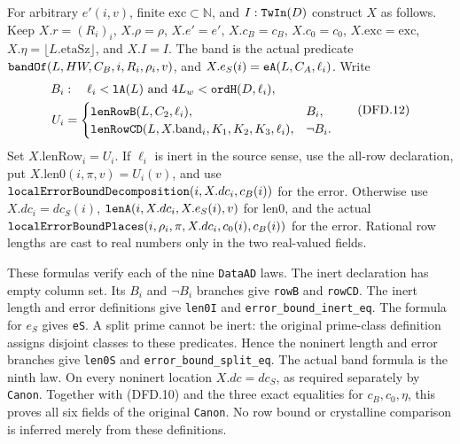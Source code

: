 For arbitrary $e'(i,v)$, finite $\mathrm{exc}\subset\mathbb N$,
and $I:\texttt{Tw\allowbreak In}(D)$ construct $X$ as follows. Keep
$X.r=(R_i)_i$, $X.\rho=\rho$, $X.e'=e'$, $X.c_B=c_B$,
$X.c_0=c_0$, $X.\mathrm{exc}=\mathrm{exc}$,
$X.\eta=\lfloor L.\mathrm{etaSz}\rfloor$, and $X.I=I$.
The band is the actual predicate
$\texttt{band\allowbreak Of}(L,HW,C_B,i,R_i,\rho_i,v)$, and
$X.e_S(i)=\texttt{e\allowbreak A}(L,C_A,\ell_i)$. Write
\[
 \begin{split}
 B_i&:\quad\ell_i<\texttt{l\allowbreak A}(L)
                    \ \text{and}\ 4L_w<\texttt{ord\allowbreak H}(D,\ell_i),\\
 U_i&=\begin{cases}
 \texttt{len\allowbreak Row\allowbreak B}(L,C_2,\ell_i),&B_i,\\
 \texttt{len\allowbreak Row\allowbreak CD}(L,X.\mathrm{band}_i,K_1,K_2,K_3,\ell_i),&\neg B_i.
 \end{cases}
 \end{split}                                           \tag{DFD.12}
\]
Set $X.\mathrm{lenRow}_i=U_i$. If $\ell_i$ is inert in the
source sense, use the all-row declaration, put
$X.\mathrm{len0}(i,\pi,v)=U_i(v)$, and use
$\texttt{local\allowbreak Error\allowbreak Bound\allowbreak Decomposition}(i,X.dc_i,c_B(i))$
for the error. Otherwise use $X.dc_i=dc_S(i)$,
$\texttt{len\allowbreak A}(i,X.dc_i,X.e_S(i),v)$ for $\mathrm{len0}$,
and the actual
$\texttt{local\allowbreak Error\allowbreak Bound\allowbreak Places}(i,\rho_i,\pi,X.dc_i,c_0(i),c_B(i))$
for the error. Rational row lengths are cast to real numbers
only in the two real-valued fields.

These formulas verify each of the nine \texttt{Data\allowbreak AD} laws.
The inert declaration has empty column set. Its $B_i$ and
$\neg B_i$ branches give \texttt{row\allowbreak B} and \texttt{row\allowbreak CD}.
The inert length and error definitions give \texttt{len0I}
and \texttt{error\_\allowbreak bound\_\allowbreak inert\_\allowbreak eq}. The formula for $e_S$
gives \texttt{e\allowbreak S}. A split prime cannot be inert: the
original prime-class definition assigns disjoint classes to
these predicates. Hence the noninert length and error branches
give \texttt{len0S} and \texttt{error\_\allowbreak bound\_\allowbreak split\_\allowbreak eq}.
The actual band formula is the ninth law. On every noninert
location $X.dc=dc_S$, as required separately by
\texttt{Canon}. Together with (DFD.10) and the three exact
equalities for $c_B,c_0,\eta$, this proves all six fields of
the original \texttt{Canon}. No row bound or crystalline
comparison is inferred merely from these definitions.

